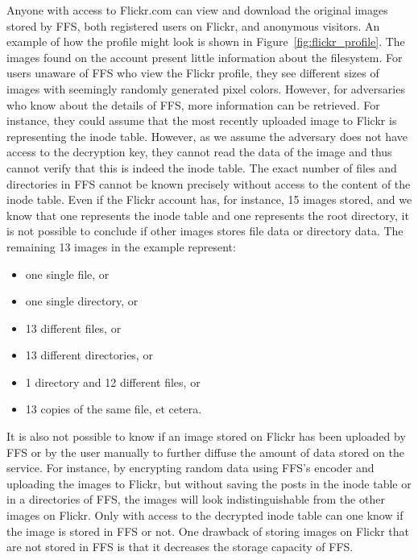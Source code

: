 Anyone with access to Flickr.com can view and download the original images stored by FFS, both registered users on Flickr, and anonymous visitors. An example of how the profile might look is shown in Figure~\ref{fig:flickr_profile}. The images found on the account present little information about the filesystem. For users unaware of FFS who view the Flickr profile, they see different sizes of images with seemingly randomly generated pixel colors. However, for adversaries who know about the details of FFS, more information can be retrieved. For instance, they could assume that the most recently uploaded image to Flickr is representing the inode table. However, as we assume the adversary does not have access to the decryption key, they cannot read the data of the image and thus cannot verify that this is indeed the inode table. The exact number of files and directories in FFS cannot be known precisely without access to the content of the inode table. Even if the Flickr account has, for instance, 15 images stored, and we know that one represents the inode table and one represents the root directory, it is not possible to conclude if other images stores file data or directory data. The remaining 13 images in the example represent:
\begin{itemize}
	\item one single file, or
	\item one single directory, or
	\item 13 different files, or
	\item 13 different directories, or
	\item 1 directory and 12 different files, or
	\item 13 copies of the same file, et cetera.
\end{itemize}
It is also not possible to know if an image stored on Flickr has been uploaded by FFS or by the user manually to further diffuse the amount of data stored on the service. For instance, by encrypting random data using FFS's encoder and uploading the images to Flickr, but without saving the posts in the inode table or in a directories of FFS, the images will look indistinguishable from the other images on Flickr. Only with access to the decrypted inode table can one know if the image is stored in FFS or not. One drawback of storing images on Flickr that are not stored in FFS is that it decreases the storage capacity of FFS.

